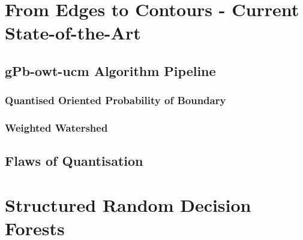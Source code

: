 
\chapter{From Edges to Contours - Current State-of-the-Art}
\label{Chapter2}
\section{gPb-owt-ucm Algorithm Pipeline}
\subsection{Quantised Oriented Probability of Boundary}
\subsection{Weighted Watershed}
\section{Flaws of Quantisation}

\chapter{Structured Random Decision Forests}
\label{Chapter3}
